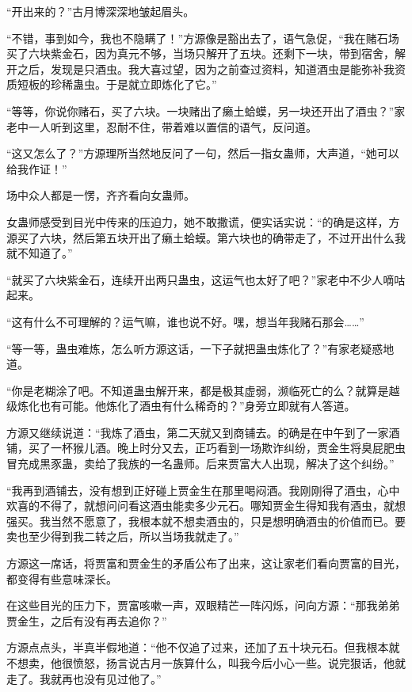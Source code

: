 
\begin{this_body}



“开出来的？”古月博深深地皱起眉头。

“不错，事到如今，我也不隐瞒了！”方源像是豁出去了，语气急促，“我在赌石场买了六块紫金石，因为真元不够，当场只解开了五块。还剩下一块，带到宿舍，解开之后，发现是只酒虫。我大喜过望，因为之前查过资料，知道酒虫是能弥补我资质短板的珍稀蛊虫。于是就立即炼化了它。”

“等等，你说你赌石，买了六块。一块赌出了癞土蛤蟆，另一块还开出了酒虫？”家老中一人听到这里，忍耐不住，带着难以置信的语气，反问道。

“这又怎么了？”方源理所当然地反问了一句，然后一指女蛊师，大声道，“她可以给我作证！”

场中众人都是一愣，齐齐看向女蛊师。

女蛊师感受到目光中传来的压迫力，她不敢撒谎，便实话实说：“的确是这样，方源买了六块，然后第五块开出了癞土蛤蟆。第六块也的确带走了，不过开出什么我就不知道了。”

“就买了六块紫金石，连续开出两只蛊虫，这运气也太好了吧？”家老中不少人嘀咕起来。

“这有什么不可理解的？运气嘛，谁也说不好。嘿，想当年我赌石那会……”

“等一等，蛊虫难炼，怎么听方源这话，一下子就把蛊虫炼化了？”有家老疑惑地道。

“你是老糊涂了吧。不知道蛊虫解开来，都是极其虚弱，濒临死亡的么？就算是越级炼化也有可能。他炼化了酒虫有什么稀奇的？”身旁立即就有人答道。

方源又继续说道：“我炼了酒虫，第二天就又到商铺去。的确是在中午到了一家酒铺，买了一杯猴儿酒。晚上时分又去，正巧看到一场欺诈纠纷，贾金生将臭屁肥虫冒充成黒豕蛊，卖给了我族的一名蛊师。后来贾富大人出现，解决了这个纠纷。”

“我再到酒铺去，没有想到正好碰上贾金生在那里喝闷酒。我刚刚得了酒虫，心中欢喜的不得了，就想问问看这酒虫能卖多少元石。哪知贾金生得知我有酒虫，就想强买。我当然不愿意了，我根本就不想卖酒虫的，只是想明确酒虫的价值而已。要卖也至少得到我二转之后，所以当场我就走了。”

方源这一席话，将贾富和贾金生的矛盾公布了出来，这让家老们看向贾富的目光，都变得有些意味深长。

在这些目光的压力下，贾富咳嗽一声，双眼精芒一阵闪烁，问向方源：“那我弟弟贾金生，之后有没有再去追你？”

方源点点头，半真半假地道：“他不仅追了过来，还加了五十块元石。但我根本就不想卖，他很愤怒，扬言说古月一族算什么，叫我今后小心一些。说完狠话，他就走了。我就再也没有见过他了。”


\end{this_body}
